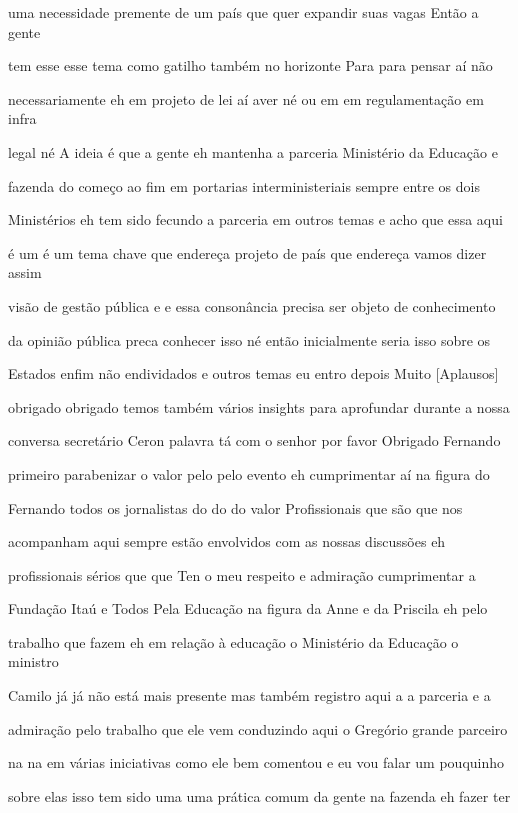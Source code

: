 \documentclass[a4paper,12pt]{article}
\begin{document}
uma necessidade premente de um país que quer expandir suas vagas Então a gente

tem esse esse tema como gatilho também no horizonte Para para pensar aí não

necessariamente eh em projeto de lei aí aver né ou em em regulamentação em infra

legal né A ideia é que a gente eh mantenha a parceria Ministério da Educação e

fazenda do começo ao fim em portarias interministeriais sempre entre os dois

Ministérios eh tem sido fecundo a parceria em outros temas e acho que essa aqui

é um é um tema chave que endereça projeto de país que endereça vamos dizer assim

visão de gestão pública e e essa consonância precisa ser objeto de conhecimento

da opinião pública preca conhecer isso né então inicialmente seria isso sobre os

Estados enfim não endividados e outros temas eu entro depois Muito [Aplausos]

obrigado obrigado temos também vários insights para aprofundar durante a nossa

conversa secretário Ceron palavra tá com o senhor por favor Obrigado Fernando

primeiro parabenizar o valor pelo pelo evento eh cumprimentar aí na figura do

Fernando todos os jornalistas do do do valor Profissionais que são que nos

acompanham aqui sempre estão envolvidos com as nossas discussões eh

profissionais sérios que que Ten o meu respeito e admiração cumprimentar a

Fundação Itaú e Todos Pela Educação na figura da Anne e da Priscila eh pelo

trabalho que fazem eh em relação à educação o Ministério da Educação o ministro

Camilo já já não está mais presente mas também registro aqui a a parceria e a

admiração pelo trabalho que ele vem conduzindo aqui o Gregório grande parceiro

na na em várias iniciativas como ele bem comentou e eu vou falar um pouquinho

sobre elas isso tem sido uma uma prática comum da gente na fazenda eh fazer ter
\end{document}
